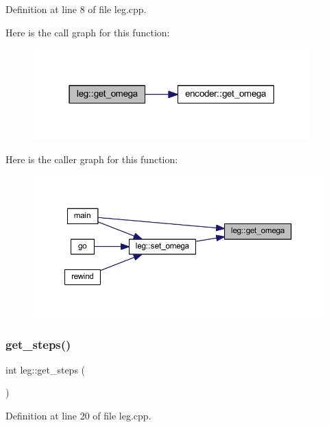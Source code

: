 Definition at line 8 of file leg.\+cpp.

Here is the call graph for this function\+:
\nopagebreak
\begin{figure}[H]
\begin{center}
\leavevmode
\includegraphics[width=304pt]{classleg_a90a92add134cc7f610202ae703ed8857_cgraph}
\end{center}
\end{figure}
Here is the caller graph for this function\+:
\nopagebreak
\begin{figure}[H]
\begin{center}
\leavevmode
\includegraphics[width=350pt]{classleg_a90a92add134cc7f610202ae703ed8857_icgraph}
\end{center}
\end{figure}
\mbox{\label{classleg_a36761ba08ae602b76c4adf168d2ae531}} 
\subsubsection{\texorpdfstring{get\_steps()}{get\_steps()}}
{\footnotesize\ttfamily int leg\+::get\+\_\+steps (\begin{DoxyParamCaption}{ }\end{DoxyParamCaption})}



Definition at line 20 of file leg.\+cpp.

\mbox{\label{classleg_aa82b5f0d5d173b0b6202c2e0ac207aeb}} 
